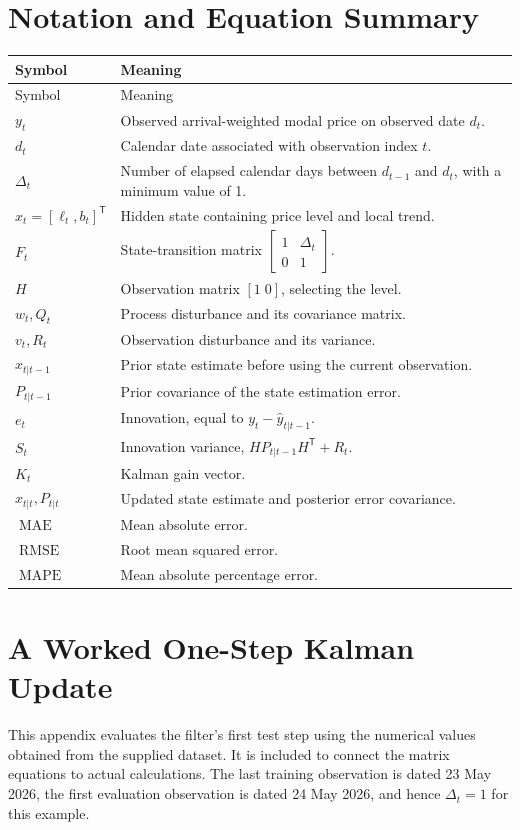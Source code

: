 \documentclass[12pt,a4paper,oneside]{report}
\numberwithin{equation}{chapter}
\numberwithin{figure}{chapter}
\numberwithin{table}{chapter}
\theoremstyle{definition}
\theoremstyle{plain}
\newcommand{\1}{\mathbf{1}}
\newcommand{\trans}{^{\mathsf T}}
\newcommand{\hatt}[1]{\widehat{#1}}
\begin{document}
\chapter{Notation and Equation Summary}
\begin{longtable}{@{}p{}p{}@{}}
\toprule
Symbol & Meaning \\
\midrule
\endfirsthead
\toprule
Symbol & Meaning \\
\midrule
\endhead
$y_t$ & Observed arrival-weighted modal price on observed date $d_t$. \\
$d_t$ & Calendar date associated with observation index $t$. \\
$\Delta_t$ & Number of elapsed calendar days between $d_{t-1}$ and $d_t$, with a minimum value of 1. \\
$x_t=[\ell_t,b_t]\trans$ & Hidden state containing price level and local trend. \\
$F_t$ & State-transition matrix $\begin{bmatrix}1&\Delta_t\\0&1\end{bmatrix}$. \\
$H$ & Observation matrix $[1\;0]$, selecting the level. \\
$w_t,Q_t$ & Process disturbance and its covariance matrix. \\
$v_t,R_t$ & Observation disturbance and its variance. \\
$\hatt{x}_{t|t-1}$ & Prior state estimate before using the current observation. \\
$P_{t|t-1}$ & Prior covariance of the state estimation error. \\
$e_t$ & Innovation, equal to $y_t-\hatt{y}_{t|t-1}$. \\
$S_t$ & Innovation variance, $HP_{t|t-1}H\trans+R_t$. \\
$K_t$ & Kalman gain vector. \\
$\hatt{x}_{t|t},P_{t|t}$ & Updated state estimate and posterior error covariance. \\
$\operatorname{MAE}$ & Mean absolute error. \\
$\operatorname{RMSE}$ & Root mean squared error. \\
$\operatorname{MAPE}$ & Mean absolute percentage error. \\
\bottomrule
\end{longtable}

\chapter{A Worked One-Step Kalman Update}
This appendix evaluates the filter's first test step using the numerical values obtained from the supplied dataset. It is included to connect the matrix equations to actual calculations. The last training observation is dated 23 May 2026, the first evaluation observation is dated 24 May 2026, and hence $\Delta_t=1$ for this example.
\end{document}
